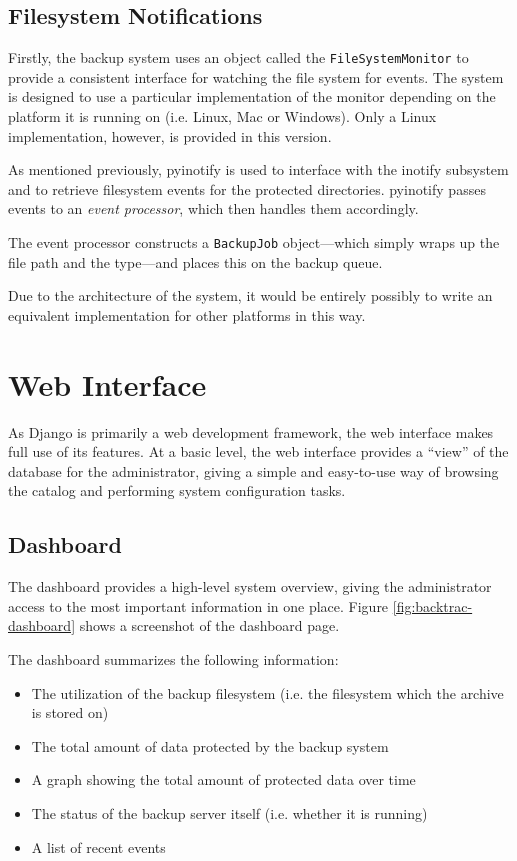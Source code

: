 \subsection{Filesystem Notifications}
\label{sec:implementation-client-fsnotify}

Firstly, the backup system uses an object called the \verb!FileSystemMonitor!
to provide a consistent interface for watching the file system for events. The
system is designed to use a particular implementation of the monitor depending
on the platform it is running on (i.e. Linux, Mac or Windows). Only a Linux
implementation, however, is provided in this version.

As mentioned previously, pyinotify is used to interface with the inotify
subsystem and to retrieve filesystem events for the protected directories.
pyinotify passes events to an \emph{event processor}, which then handles them
accordingly.

The event processor constructs a \verb!BackupJob! object---which simply wraps
up the file path and the type---and places this on the backup queue.

Due to the architecture of the system, it would be entirely possibly to write
an equivalent implementation for other platforms in this way.

\section{Web Interface}
\label{sec:implementation-web}

As Django is primarily a web development framework, the web interface makes
full use of its features. At a basic level, the web interface provides
a ``view'' of the database for the administrator, giving a simple and
easy-to-use way of browsing the catalog and performing system configuration
tasks.

\subsection{Dashboard}
\label{sec:implementation-web-dashboard}

The dashboard provides a high-level system overview, giving the administrator
access to the most important information in one place. Figure
\ref{fig:backtrac-dashboard} shows a screenshot of the dashboard page.

The dashboard summarizes the following information:

\begin{itemize}
    \item The utilization of the backup filesystem (i.e. the filesystem which
        the archive is stored on)
    \item The total amount of data protected by the backup system
    \item A graph showing the total amount of protected data over time
    \item The status of the backup server itself (i.e. whether it is running)
    \item A list of recent events
\end{itemize}

